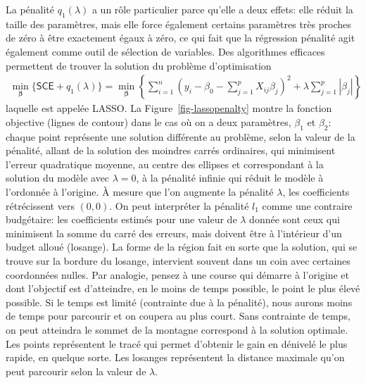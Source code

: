 \documentclass[
  11pt,
  letterpaper,
]{scrbook}
\theoremstyle{definition}
\theoremstyle{remark}
\begin{document}
La pénalité \(q_1(\lambda)\) a un rôle particulier parce qu'elle a deux
effets: elle réduit la taille des paramètres, mais elle force également
certains paramètres très proches de zéro à être exactement égaux à zéro,
ce qui fait que la régression pénalité agit également comme outil de
sélection de variables. Des algorithmes efficaces permettent de trouver
la solution du problème d'optimisation \begin{align*}
\min_{\boldsymbol{\beta}} \{\mathsf{SCE} + q_1(\lambda)\} = \min_{\boldsymbol{\beta}}  \left\{\sum_{i=1}^n \left(y_i - \beta_0 - \sum_{j=1}^pX_{ij}\beta_{j}\right)^2 +
\lambda \sum_{j=1}^p |\beta_j|\right\}
\end{align*} laquelle est appelée LASSO. La
Figure~\ref{fig-lassopenalty} montre la fonction objective (lignes de
contour) dans le cas où on a deux paramètres, \(\beta_1\) et
\(\beta_2\): chaque point représente une solution différente au
problème, selon la valeur de la pénalité, allant de la solution des
moindres carrés ordinaires, qui minimisent l'erreur quadratique moyenne,
au centre des ellipses et correspondant à la solution du modèle avec
\(\lambda=0\), à la pénalité infinie qui réduit le modèle à l'ordonnée à
l'origine. À mesure que l'on augmente la pénalité \(\lambda\), les
coefficients rétrécissent vers \((0, 0)\). On peut interpréter la
pénalité \(l_1\) comme une contraire budgétaire: les coefficients
estimés pour une valeur de \(\lambda\) donnée sont ceux qui minimisent
la somme du carré des erreurs, mais doivent être à l'intérieur d'un
budget alloué (losange). La forme de la région fait en sorte que la
solution, qui se trouve sur la bordure du losange, intervient souvent
dans un coin avec certaines coordonnées nulles. Par analogie, pensez à
une course qui démarre à l'origine et dont l'objectif est d'atteindre,
en le moins de temps possible, le point le plus élevé possible. Si le
temps est limité (contrainte due à la pénalité), nous aurons moins de
temps pour parcourir et on coupera au plus court. Sans contrainte de
temps, on peut atteindra le sommet de la montagne correspond à la
solution optimale. Les points représentent le tracé qui permet d'obtenir
le gain en dénivelé le plus rapide, en quelque sorte. Les losanges
représentent la distance maximale qu'on peut parcourir selon la valeur
de \(\lambda\).
\end{document}
